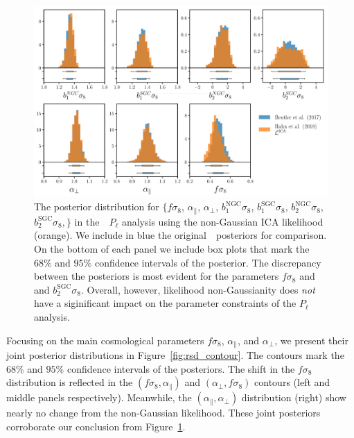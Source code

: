 \documentclass[12pt, letterpaper, preprint]{aastex}
\newcommand{\Beut}{\citetalias{beutler2017}}
\begin{document}
\begin{figure}
\begin{center}
\includegraphics[width=\textwidth]{figs/Like_Pk_comparison.pdf}
\caption{The posterior distribution for 
    $\big \{f \sigma_8$, $\alpha_\parallel$, $\alpha_\perp$, 
    $b_1^\mathrm{NGC} \sigma_8$, $b_1^\mathrm{SGC} \sigma_8$, 
    $b_2^\mathrm{NGC} \sigma_8$, $b_2^\mathrm{SGC} \sigma_8,\big \}$ 
    in the~\Beut~$P_\ell$ analysis using the non-Gaussian ICA 
    likelihood (orange). We include in blue the original~\Beut~posteriors 
    for comparison. On the bottom of each panel we include box 
    plots that mark the $68\%$ and $95\%$ confidence intervals of
    the posterior. The discrepancy between the posteriors is most 
    evident for the parameters $f\sigma_8$ and and $b^\mathrm{SGC}_2 \sigma_8$.  
    Overall, however, likelihood non-Gaussianity does \emph{not} 
    have a siginificant impact on the parameter constraints of 
    the $P_\ell$ analysis.} 
\label{fig:pk_like}
\end{center}
\end{figure}

Focusing on the main cosmological parameters $f \sigma_8$, 
$\alpha_\parallel$, and $\alpha_\perp$, we present their 
joint posterior distributions in Figure~\ref{fig:rsd_contour}.  
The contours mark the $68\%$ and $95\%$ confidence intervals
of the posteriors. The shift in the $f \sigma_8$ distribution 
is reflected in the
$(f\sigma_8, \alpha_\parallel)$ and $(\alpha_\perp, f\sigma_8)$ 
contours (left and middle panels respectively). Meanwhile, the
$(\alpha_\parallel, \alpha_\perp)$ distribution (right) show nearly 
no change from the non-Gaussian likelihood. These joint posteriors 
corroborate our conclusion from Figure~\ref{fig:pk_like}.
\end{document}
